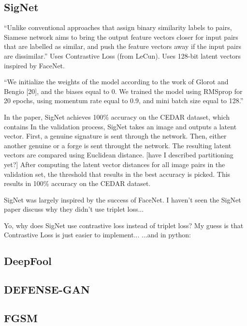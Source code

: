 \subsection{SigNet}
``Unlike conventional approaches that assign
binary similarity labels to pairs, Siamese network aims to bring
the output feature vectors closer for input pairs that are labelled
as similar, and push the feature vectors away if the input pairs
are dissimilar.''
Uses Contrastive Loss (from LeCun).
Uses 128-bit latent vectors inspired by FaceNet.

``We initialize the weights of the model according to the work
of Glorot and Bengio [20], and the biases equal to 0. We trained
the model using RMSprop for 20 epochs, using momentum rate
equal to 0.9, and mini batch size equal to 128.''

In the paper, SigNet achieves 100\% accuracy on the CEDAR dataset, which contains 
In the validation process, SigNet takes an image and outputs a latent vector.
First, a genuine signature is sent through the network.
Then, either another genuine or a forge is sent throught the network.
The resulting latent vectors are compared using Euclidean distance.
[have I described partitioning yet?]
After computing the latent vector distances for all image pairs in the validation set, the threshold that results in the best accuracy is picked.
This results in 100\% accuracy on the CEDAR dataset.

SigNet was largely inspired by the success of FaceNet.
I haven't seen the SigNet paper discuss why they didn't use triplet loss...

Yo, why does SigNet use contrastive loss instead of triplet loss?
    My guess is that Contrastive Loss is just easier to implement...
\cite{sig_net}
\cite{GitHub_sounakdey}
...and in python: \cite{GitHub_signet_pytorch}

\subsection{DeepFool}
\subsection{DEFENSE-GAN}

\subsection{FGSM}


